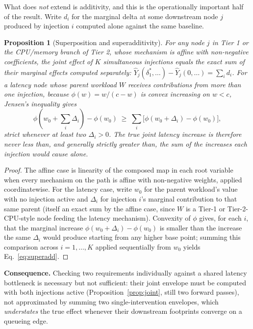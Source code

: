 \documentclass[journal, 10pt]{IEEEtran}
\newtheorem{proposition}{Proposition}
\begin{document}
What does \emph{not} extend is additivity, and this is the operationally
important half of the result. Write $d_i$ for the marginal delta at some
downstream node $j$ produced by injection $i$ computed alone against the same
baseline.

\begin{proposition}[Superposition and superadditivity]
\label{prop:superadd}
For any node $j$ in Tier 1 or the CPU/memory branch of Tier 2, whose mechanism
is affine with non-negative coefficients, the joint effect of $K$ simultaneous
injections equals the exact sum of their marginal effects computed separately:
$\hat{Y}_j(\delta_1^*,\ldots) - \hat{Y}_j(0,\ldots) = \sum_i d_i$. For a latency
node whose parent workload $W$ receives contributions from more than one
injection, because $\phi(w)=w/(c-w)$ is convex increasing on $w<c$, Jensen's
inequality gives
\begin{equation}
\phi(w_0{+}\textstyle\sum_i \Delta_i) - \phi(w_0) \;\geq\; \sum_i \big[\phi(w_0{+}\Delta_i)-\phi(w_0)\big],
\label{eq:superadd}
\end{equation}
strict whenever at least two $\Delta_i>0$. The true joint latency increase is
therefore never less than, and generally strictly greater than, the sum of the
increases each injection would cause alone.
\end{proposition}

\begin{proof}
The affine case is linearity of the composed map in each root variable when
every mechanism on the path is affine with non-negative weights, applied
coordinatewise. For the latency case, write $w_0$ for the parent workload's
value with no injection active and $\Delta_i$ for injection $i$'s marginal
contribution to that same parent (itself an exact sum by the affine case,
since $W$ is a Tier-1 or Tier-2-CPU-style node feeding the latency mechanism).
Convexity of $\phi$ gives, for each $i$, that the marginal increase
$\phi(w_0+\Delta_i)-\phi(w_0)$ is smaller than the increase the same $\Delta_i$
would produce starting from any higher base point; summing this comparison
across $i=1,\ldots,K$ applied sequentially from $w_0$ yields
Eq.~\eqref{eq:superadd}.
\end{proof}

\textbf{Consequence.} Checking two requirements individually against a shared
latency bottleneck is necessary but not sufficient: their joint envelope must
be computed with both injections active (Proposition~\ref{prop:joint}, still
two forward passes), not approximated by summing two single-intervention
envelopes, which \emph{understates} the true effect whenever their downstream
footprints converge on a queueing edge.
\end{document}
